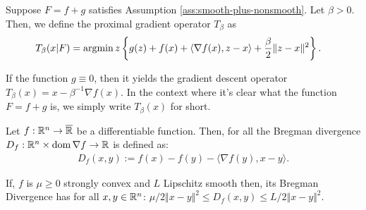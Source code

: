 \documentclass[12pt]{article}
\begin{document}
        \begin{definition}
            Suppose $F = f + g$ satisfies Assumption \ref{ass:smooth-plus-nonsmooth}. 
            Let $\beta > 0$. 
            Then, we define the proximal gradient operator $T_{\beta}$ as 
            \begin{align*}
                T_\beta (x | F) &= \mathop{\rm argmin}\limits{z} \left\lbrace
                    g(z) + f(x) + \langle \nabla f(x), z - x\rangle + \frac{\beta}{2}\Vert z - x\Vert^2
                \right\rbrace. 
            \end{align*}
        \end{definition}
        \begin{remark}
            If the function $g \equiv 0$, then it yields the gradient descent operator $T_\beta(x) = x - \beta^{-1}\nabla f(x)$. 
            In the context where it's clear what the function $F = f + g$ is, we simply write $T_\beta(x)$ for short. 
        \end{remark}

        \begin{definition}
            Let $f:\mathbb R^n \rightarrow \overline {\mathbb R}$ be a differentiable function. 
            Then, for all the Bregman divergence $D_f: \mathbb R^n \times \operatorname{dom}\nabla f \rightarrow \mathbb R$ is defined as: 
            \begin{align*}
                D_f(x, y) := f(x) - f(y) - \langle \nabla f(y), x - y\rangle. 
            \end{align*}
        \end{definition}
        \begin{remark}
            If, $f$ is $\mu \ge 0$ strongly convex and $L$ Lipschitz smooth then, its Bregman Divergence has for all $x, y \in \mathbb R^n$: $\mu/2 \Vert x - y\Vert^2 \le D_f(x, y) \le L/2 \Vert x - y\Vert^2$. 
        \end{remark}
\end{document}

